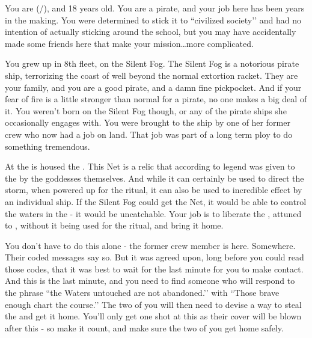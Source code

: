 \documentclass[char]{GL2020}
\begin{document}
\name{\cPirateChild{}}


You are \cPirateChild{\full} (\cPirateChild{\they}/\cPirateChild{\them}), and 18 years old. You are a \pShip{} pirate, and your job here has been years in the making. You were determined to stick it to ``civilized society’’ and had no intention of actually sticking around the school, but you may have accidentally made some friends here that make your mission\ldots more complicated.

You grew up in 8th fleet, on the Silent Fog. The Silent Fog is a notorious pirate ship, terrorizing the coast of \pFarm{} well beyond the normal extortion racket. They are your family, and you are a good pirate, and a damn fine pickpocket. And if your fear of fire is a little stronger than normal for a pirate, no one makes a big deal of it. You weren’t born on the Silent Fog though, or any of the pirate ships she occasionally engages with. You were brought to the ship by one of her former crew who now had a job on land. That job was part of a long term ploy to do something tremendous.

At the \pSchool{} is housed the \iNet{}. This Net is a relic that according to legend was given to the \pShip{} by the goddesses themselves. And while it can certainly be used to direct the storm, when powered up for the ritual, it can also be used to incredible effect by an individual ship. If the Silent Fog could get the Net, it would be able to control the waters in the \pWod{} - it would be uncatchable. Your job is to liberate the \iNet{}, attuned to \pShip{}, without it being used for the ritual, and bring it home. 

You don’t have to do this alone - the former crew member is here. Somewhere. Their coded messages say so. But it was agreed upon, long before you could read those codes, that it was best to wait for the last minute for you to make contact. And this is the last minute, and you need to find someone who will respond to the phrase ``the Waters untouched are not abandoned.’’ with ``Those brave enough chart the course.’’ The two of you will then need to devise a way to steal the \iNet{} and get it home. You’ll only get one shot at this as their cover will be blown after this - so make it count, and make sure the two of you get home safely.
\end{document}
